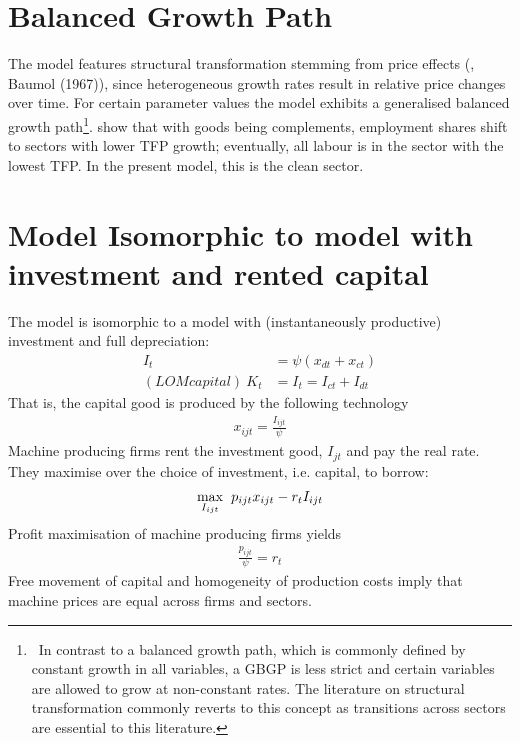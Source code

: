 \section{Balanced Growth Path}

The model features structural transformation stemming from price effects (\cite{Ngai2007StructuralGrowth}, Baumol (1967)), since heterogeneous growth rates result in relative price changes over time. %
For certain parameter values the model exhibits a generalised balanced growth path\footnote{\ 
In contrast to a balanced growth path, which is commonly defined by constant growth in all variables, a GBGP is less strict and certain variables are allowed to grow at non-constant rates. The literature on structural transformation commonly reverts to this concept as transitions across sectors are essential to this literature.}.
\cite{Ngai2007StructuralGrowth} show that with goods being complements, employment shares shift to sectors with lower TFP growth; eventually, all labour is in the sector with the lowest TFP. In the present model, this is the clean sector. 

\section{Model Isomorphic to model with investment and rented capital}
The model is isomorphic to a model with (instantaneously productive) investment and full depreciation: 
\begin{align*}
I_t&=\psi(x_{dt}+x_{ct})\\
(LOM capital) \ K_t&=I_t= I_{ct}+I_{dt}
\end{align*}
That is, the capital good is produced by the following technology
\begin{align*}
x_{ijt}=\frac{I_{ijt}}{\psi}
\end{align*}
Machine producing firms rent the investment good, $I_{jt}$ and pay the real rate. They maximise over the choice of investment, i.e. capital, to borrow:
\begin{align*}
\underset{I_{ijt}}{\max}\hspace{2mm}p_{ijt}x_{ijt}-r_tI_{ijt}
\end{align*}
Profit maximisation of machine producing firms yields
\begin{align*}
\frac{p_{ijt}}{\psi}=r_t
\end{align*}
Free movement of capital and homogeneity of production costs imply that machine prices are equal across firms and sectors. 


